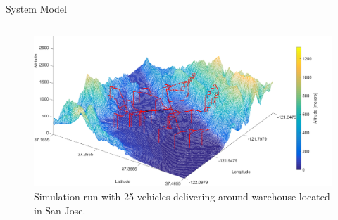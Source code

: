 \documentclass[final]{beamer}
\newlength{\onecolwid}
\newlength{\twocolwid}
\begin{document}
\begin{frame}[t]
\begin{columns}[t]
\begin{column}{\twocolwid}
\begin{columns}[t,totalwidth=\twocolwid]
\begin{column}{\onecolwid}
\begin{block}{System Model}
{\small\par}

\end{block}


%
%
%
%
%


\end{column} %

\end{columns} %



{\small\par}

\begin{figure}
\includegraphics[width=1\linewidth]{images/poster_terrain.png}
\caption{Simulation run with 25 vehicles delivering around warehouse located in San Jose.}
\end{figure}



\end{column}
\end{columns}
\end{frame}
\end{document}
